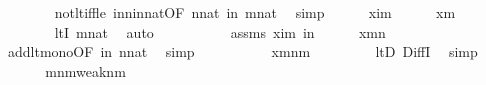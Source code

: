 \begin{isabellebody}
\ \ \ \ \ \ \isamarkupfalse%
\ not{\isacharunderscore}{\kern0pt}lt{\isacharunderscore}{\kern0pt}iff{\isacharunderscore}{\kern0pt}le\ in{\isacharunderscore}{\kern0pt}n{\isacharunderscore}{\kern0pt}in{\isacharunderscore}{\kern0pt}nat{\isacharbrackleft}{\kern0pt}OF\ {\isacartoucheopen}n{\isasymin}nat{\isacartoucheclose}\ {\isacartoucheopen}i{\isasymin}n{\isacartoucheclose}{\isacharbrackright}{\kern0pt}\ {\isacartoucheopen}m{\isasymin}nat{\isacartoucheclose}\ \isamarkupfalse%
\ simp\isanewline
\ \ \ \ \isamarkupfalse%
\ {\isacartoucheopen}x{\isacharequal}{\kern0pt}i{\isacharhash}{\kern0pt}{\isacharplus}{\kern0pt}m{\isacartoucheclose}\isanewline
\ \ \ \ \isamarkupfalse%
\ {\isachardoublequoteopen}x{\isasymnotin}m{\isachardoublequoteclose}\ \isanewline
\ \ \ \ \ \ \isamarkupfalse%
\ ltI\ {\isacartoucheopen}m{\isasymin}nat{\isacartoucheclose}\ \isamarkupfalse%
\ auto\isanewline
\ \ \ \ \isamarkupfalse%
\isanewline
\ \ \ \ \isamarkupfalse%
\ assms\ {\isacartoucheopen}x{\isacharequal}{\kern0pt}i{\isacharhash}{\kern0pt}{\isacharplus}{\kern0pt}m{\isacartoucheclose}\ {\isacartoucheopen}i{\isacharless}{\kern0pt}n{\isacartoucheclose}\isanewline
\ \ \ \ \isamarkupfalse%
\ {\isachardoublequoteopen}x{\isacharless}{\kern0pt}m{\isacharhash}{\kern0pt}{\isacharplus}{\kern0pt}n{\isachardoublequoteclose}\isanewline
\ \ \ \ \ \ \isamarkupfalse%
\ add{\isacharunderscore}{\kern0pt}lt{\isacharunderscore}{\kern0pt}mono{}{\isacharbrackleft}{\kern0pt}OF\ {\isacartoucheopen}i{\isacharless}{\kern0pt}n{\isacartoucheclose}\ {\isacartoucheopen}n{\isasymin}nat{\isacartoucheclose}{\isacharbrackright}{\kern0pt}\ \isamarkupfalse%
\ simp\isanewline
\ \ \ \ \isamarkupfalse%
\isanewline
\ \ \ \ \isamarkupfalse%
\ {\isachardoublequoteopen}x{\isasymin}{\isacharparenleft}{\kern0pt}m{\isacharhash}{\kern0pt}{\isacharplus}{\kern0pt}n{\isacharparenright}{\kern0pt}{\isacharminus}{\kern0pt}m{\isachardoublequoteclose}\ \isanewline
\ \ \ \ \ \ \isamarkupfalse%
\ ltD\ DiffI\ \isamarkupfalse%
\ simp\isanewline
\ \ \isamarkupfalse%
\isanewline
\ \ \isamarkupfalse%
\isanewline
\ \ \isamarkupfalse%
\ {\isachardoublequoteopen}{\isacharparenleft}{\kern0pt}m{\isacharhash}{\kern0pt}{\isacharplus}{\kern0pt}n{\isacharparenright}{\kern0pt}{\isacharminus}{\kern0pt}m{\isasymsubseteq}weak{\isacharparenleft}{\kern0pt}n{\isacharcomma}{\kern0pt}m{\isacharparenright}{\kern0pt}{\isachardoublequoteclose}\ \isanewline

\end{isabellebody}
